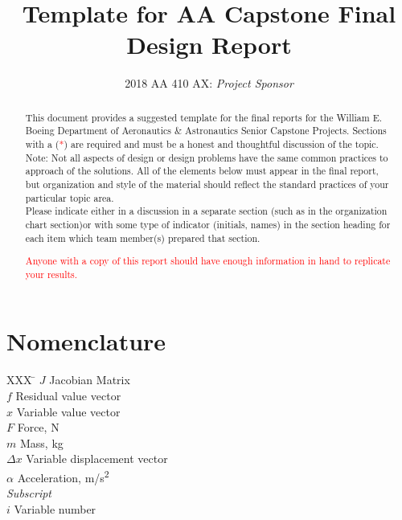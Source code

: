 \documentclass[]{aiaa-tc}%
\title{Template for AA Capstone Final Design Report}
\author{
  2018 AA 410 AX:  {\em Project Sponsor}
 }
\newcommand{\reqd}{\textcolor{red}{*}}
\begin{document}
\maketitle

\begin{abstract}
This document provides a suggested template for the final reports for the William E. Boeing Department of Aeronautics \& Astronautics Senior Capstone Projects.  Sections with a (\reqd) are required and must be a honest and thoughtful discussion of the topic.\\

Note:  Not all aspects of design or design problems have the same common practices to approach of the solutions.  All of the elements below must appear in the final report, but organization and style of the material should reflect the standard practices of your particular topic area.\\

Please indicate either in a discussion in a separate section (such as in the organization chart section)or with some type of indicator (initials, names) in the section heading for each item which team member(s) prepared that section.

\textcolor{red}{\sc Anyone with a copy of this report should have enough information in hand to replicate your results.}
\end{abstract}


\section*{Nomenclature}

\begin{tabbing}
  XXX \= \kill%
  $J$ \> Jacobian Matrix \\
  $f$ \> Residual value vector \\
  $x$ \> Variable value vector \\
  $F$ \> Force, N \\
  $m$ \> Mass, kg \\
  $\Delta x$ \> Variable displacement vector \\
  $\alpha$ \> Acceleration, m/s\textsuperscript{2} \\[5pt]
  \textit{Subscript}\\
  $i$ \> Variable number \\
 \end{tabbing}
\end{document}
